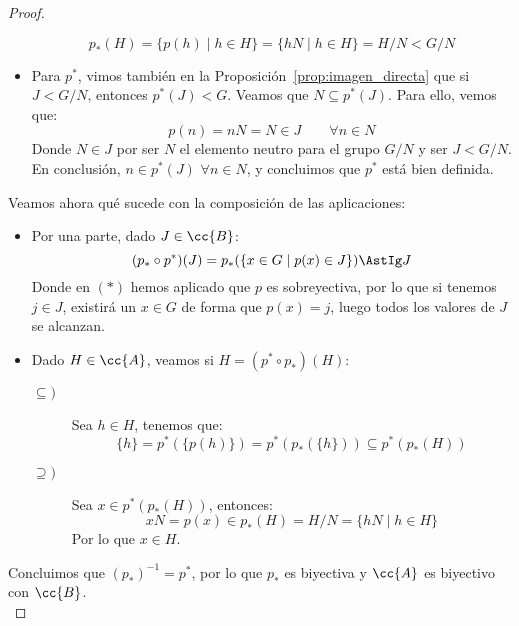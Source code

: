 \begin{teo}
\begin{proof}
\begin{itemize}
                \begin{equation*}
                    p_\ast(H) = \{p(h) \mid h \in H\} = \{hN \mid h \in H\} = H/N < G/N
                \end{equation*}
            \item Para $p^\ast$, vimos también en la Proposición~\ref{prop:imagen_directa} que si $J<G/N$, entonces $p^\ast(J)<G$. Veamos que $N\subseteq p^\ast(J)$. Para ello, vemos que:
                \begin{equation*}
                    p(n) = nN = N \in J \qquad \forall n\in N
                \end{equation*}
                Donde $N\in J$ por ser $N$ el elemento neutro para el grupo $G/N$ y ser $J < G/N$. En conclusión, $n\in p^\ast(J)$ $\forall n\in N$, y concluimos que $p^\ast$ está bien definida.
        \end{itemize}
        Veamos ahora qué sucede con la composición de las aplicaciones:
        \begin{itemize}
            \item Por una parte, dado $J\in \cc{B}$:
                \begin{equation*}
                    (p_\ast \circ p^\ast)(J) = p_\ast(\{x\in G\mid p(x) \in J\}) \AstIg J
                \end{equation*}
                Donde en $(\ast)$ hemos aplicado que $p$ es sobreyectiva, por lo que si tenemos $j\in J$, existirá un $x\in G$ de forma que $p(x) = j$, luego todos los valores de $J$ se alcanzan.
            \item Dado $H\in \cc{A}$, veamos si $H = (p^\ast \circ p_\ast)(H)$:
                \begin{description}
                    \item [$\subseteq)$] Sea $h\in H$, tenemos que:
                        \begin{equation*}
                            \{h\} = p^\ast(\{p(h)\}) = p^\ast(p_\ast(\{h\})) \subseteq p^\ast(p_\ast(H))
                        \end{equation*}
                    \item [$\supseteq)$] Sea $x\in p^\ast(p_\ast(H))$, entonces:
                        \begin{equation*}
                            xN = p(x) \in p_\ast(H) = H/N = \{hN \mid h\in H\}
                        \end{equation*}
                        Por lo que $x\in H$.
                \end{description}
        \end{itemize}
        Concluimos que ${(p_\ast)}^{-1} = p^\ast$, por lo que $p_\ast$ es biyectiva y $\cc{A}$ es biyectivo con $\cc{B}$.\\


\end{proof}
\end{teo}

